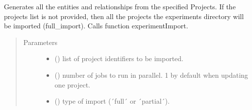 \documentclass[letterpaper,10pt,english]{sphinxmanual}
\begin{document}

\begin{fulllineitems}
\label{\detokenize{_autosummary/graphdb_builder.builder:graphdb_builder.builder.importer.experimentsImport}}
Generates all the entities and relationships from the specified Projects. If the projects list is    not provided, then all the projects the experiments directory will be imported (full\_import).     Calls function experimentImport.
\begin{quote}\begin{description}
\item[{Parameters}] \leavevmode\begin{itemize}
\item {} 
 () \textendash{} list of project identifiers to be imported.

\item {} 
 () \textendash{} number of jobs to run in parallel. 1 by default when updating one project.

\item {} 
 () \textendash{} type of import (´full´ or ´partial´).

\end{itemize}

\end{description}\end{quote}

\end{fulllineitems}

\end{document}
